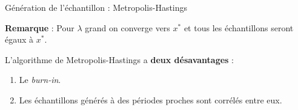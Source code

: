 \documentclass[10pt,xcolor=table,color={dvipsnames,usenames},ignorenonframetext,usepdftitle=false,french]{beamer}
\begin{document}
\begin{frame}{Génération de l'échantillon : Metropolis-Hastings}
\protect\hypertarget{guxe9nuxe9ration-de-luxe9chantillon-metropolis-hastings-1}{}

\textbf{Remarque} : Pour \(\lambda\) grand on converge vers \(x^*\) et
tous les échantillons seront égaux à \(x^*\).

\bigskip
\bigskip

\pause

L'algorithme de Metropolis-Hastings a \textbf{deux désavantages} :

\begin{enumerate}
\item Le \emph{burn-in}.
\item Les échantillons générés à des périodes proches sont corrélés entre eux. 
\end{enumerate}

\end{frame}
\end{document}
